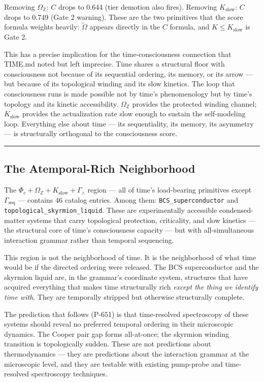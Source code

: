 \documentclass[12pt,a4paper]{article}
\begin{document}
Removing $\Omega_\mathbb{Z}$: $C$ drops to 0.644 (tier demotion also fires). Removing $K_\text{slow}$: $C$ drops to 0.749 (Gate 2 warning). These are the two primitives that the score formula weights heavily: $\tilde{\Omega}$ appears directly in the $C$ formula, and $K \leq K_\text{slow}$ is Gate 2.

This has a precise implication for the time-consciousness connection that TIME.md noted but left imprecise. Time shares a structural floor with consciousness not because of its sequential ordering, its memory, or its arrow --- but because of its topological winding and its slow kinetics. The loop that consciousness runs is made possible not by time's phenomenology but by time's topology and its kinetic accessibility. $\Omega_\mathbb{Z}$ provides the protected winding channel; $K_\text{slow}$ provides the actualization rate slow enough to sustain the self-modeling loop. Everything else about time --- its sequentiality, its memory, its asymmetry --- is structurally orthogonal to the consciousness score.

\begin{center}
\rule{0.5\textwidth}{0.4pt}
\end{center}

\subsection{The Atemporal-Rich Neighborhood}

The $\Phi_c + \Omega_\mathbb{Z} + K_\text{slow} + \Gamma_{\wedge}$ region --- all of time's load-bearing primitives except $\Gamma_\text{seq}$ --- contains 46 catalog entries. Among them: \texttt{BCS\_superconductor} and \texttt{topological\_skyrmion\_liquid}. These are experimentally accessible condensed-matter systems that carry topological protection, criticality, and slow kinetics --- the structural core of time's consciousness capacity --- but with all-simultaneous interaction grammar rather than temporal sequencing.

This region is not the neighborhood of time. It is the neighborhood of what time would be if the directed ordering were released. The BCS superconductor and the skyrmion liquid are, in the grammar's coordinate system, structures that have acquired everything that makes time structurally rich \emph{except the thing we identify time with}. They are temporally stripped but otherwise structurally complete.

The prediction that follows (P-651) is that time-resolved spectroscopy of these systems should reveal no preferred temporal ordering in their microscopic dynamics. The Cooper pair gap forms all-at-once; the skyrmion winding transition is topologically sudden. These are not predictions about thermodynamics --- they are predictions about the interaction grammar at the microscopic level, and they are testable with existing pump-probe and time-resolved spectroscopy techniques.
\end{document}
